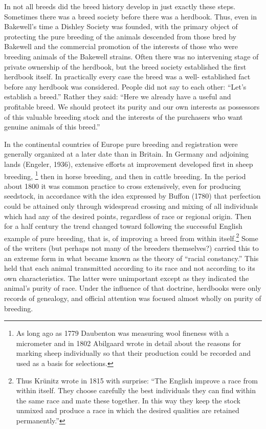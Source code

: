In not all breeds did the breed history develop in just exactly these steps. Sometimes there was a breed society before 
there was a herdbook. Thus, even in Bakewell's time a Dishley Society was founded, with the primary object of protecting 
the pure breeding of the animals descended from those bred by Bakewell and the commercial promotion of the interests of 
those who were breeding animals of the Bakewell strains. Often there was no intervening stage of private ownership of the 
herdbook, but the breed society established the first herdbook itself. In practically every case the breed was a well-
established fact before any herdbook was considered. People did not say to each other: ``Let's establish a breed.'' Rather 
they said: ``Here we already have a useful and profitable breed. We should protect its purity and our own interests as 
possessors of this valuable breeding stock and the interests of the purchasers who want genuine animals of this breed.''

In the continental countries of Europe pure breeding and registration were generally organized at a later date than in 
Britain. In Germany and adjoining lands (Engeler, 1936), extensive efforts at improvement developed first in sheep breeding,
\footnote{As long ago as 1779 Daubenton was measuring wool fineness with a micrometer and in 1802 Abilgaard wrote in detail 
about the reasons for marking sheep individually so that their production could be recorded and used as a basis for 
selections.} then in horse breeding, and then in cattle breeding. In the period about 1800 it was common practice to cross 
extensively, even for producing seedstock, in accordance with the idea expressed by Buffon (1780) that perfection could be 
attained only through widespread crossing and mixing of all individuals which had any of the desired points, regardless of 
race or regional origin. Then for a half century the trend changed toward following the successful English example of pure 
breeding, that is, of improving a breed from within itself.\footnote{Thus Kr\"{u}nitz wrote in 1815 with surprise: ``The 
English improve a race from within itself. They choose carefully the best individuals they can find within the same race 
and mate these together. In this way they keep the stock unmixed and produce a race in which the desired qualities are 
retained permanently.''} Some of the writers (but perhaps not many of the breeders themselves?) carried this to an extreme 
form in what became known as the theory of ``racial constancy.'' This held that each animal transmitted according to its 
race and not according to its own characteristics. The latter were unimportant except as they indicated the animal's purity 
of race. Under the influence of that doctrine, herdbooks were only records of genealogy, and official attention was focused 
almost wholly on purity of breeding.

